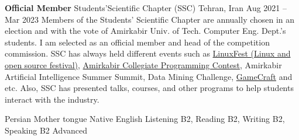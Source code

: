 \documentclass[]{awesome-cv}
\begin{document}
\vspace{2mm}
\begin{cventries}
	\cventry
	{\textbf{Official Member}}
	{Students'​ Scientific Chapter (SSC)}
	{Tehran, Iran}
	{Aug 2021 – Mar 2023}
	{Members of the Students' Scientific Chapter are annually chosen in an election and with the vote of Amirkabir Univ. of Tech. Computer Eng. Dept.'s students.
	I am selected as an official member and head of the competition commission.
	SSC has always held different events such as \href{http://linuxfest.aut.ac.ir/}{\textcolor{awesome}{LinuxFest (Linux and open source festival)}}, \href{https://icpc.aut.ac.ir/}{\textcolor{awesome}{Amirkabir
	Collegiate Programming Contest}}, Amirkabir Artificial Intelligence Summer Summit, Data Mining Challenge, \href{https://gamecraft.ce.aut.ac.ir/}{\textcolor{awesome}{GameCraft}} and etc.
	Also, SSC has presented talks, courses, and other programs to help students interact with the industry.}
\end{cventries}
\begin{cvhonors}
	\cvhonor
	{Persian}
	{Mother tongue}
	{}
	{Native}
	\cvhonor
	{English}
	{Listening B2, Reading B2, Writing B2, Speaking B2}
	{}
	{Advanced}
\end{cvhonors}
\ 
\end{document}
